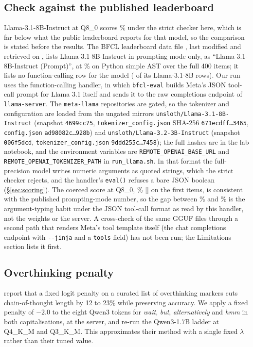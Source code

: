 \documentclass[12pt,letterpaper]{article}
\newcommand{\bfcl}{BFCL}
\newcommand{\qm}{Qwen3-1.7B}
\begin{document}
\subsection{Check against the published leaderboard}
\label{sec:sanity}
Llama-3.1-8B-Instruct at Q8\_0 scores \qtAccLlamaEightBEight{}\% under the strict checker here, which is far below what the public leaderboard reports for that model, so the comparison is stated before the results. The \bfcl{} leaderboard data file \citep{bfclleaderboard2026}, last modified \qtBfclDataDate{} and retrieved on \qtBfclFetchDate{}, lists Llama-3.1-8B-Instruct in prompting mode only, as ``Llama-3.1-8B-Instruct (Prompt)'', at \qtBfclPromptPySimple{}\% on Python simple AST over the full 400 items; it lists no function-calling row for the model (\qtBfclLlamaFcRows{} of its \qtBfclLlamaRows{} Llama-3.1-8B rows). Our run uses the function-calling handler, in which \texttt{bfcl-eval} builds Meta's JSON tool-call prompt for Llama 3.1 itself and sends it to the raw completions endpoint of \texttt{llama-server}. The \texttt{meta-llama} repositories are gated, so the tokenizer and configuration are loaded from the ungated mirrors \texttt{unsloth/Llama-3.1-8B-Instruct} (snapshot \texttt{4699cc75}, \texttt{tokenizer\_config.json} SHA-256 \texttt{671ecdff\ldots{}3465}, \texttt{config.json} \texttt{ad98082c\ldots{}928b}) and \texttt{unsloth/Llama-3.2-3B-Instruct} (snapshot \texttt{006f5dcd}, \texttt{tokenizer\_config.json} \texttt{9ddd255c\ldots{}7458}); the full hashes are in the lab notebook, and the environment variables are \texttt{REMOTE\_OPENAI\_BASE\_URL} and \texttt{REMOTE\_OPENAI\_TOKENIZER\_PATH} in \texttt{run\_llama.sh}. In that format the full-precision model writes numeric arguments as quoted strings, which the strict checker rejects, and the handler's \texttt{eval()} refuses a bare JSON boolean (\S\ref{sec:scoring}). The coerced score at Q8\_0, \qtCoercedAccLlamaEightBEight{}\% [\qtCoercedCiLlamaEightBEight{}] on the first \qtNEightB{} items, is consistent with the published prompting-mode number, so the gap between \qtAccLlamaEightBEight{}\% and \qtBfclPromptPySimple{}\% is the argument-typing habit under the JSON tool-call format as read by this handler, not the weights or the server. A cross-check of the same GGUF files through a second path that renders Meta's tool template itself (the chat completions endpoint with \texttt{-{}-jinja} and a \texttt{tools} field) has not been run; the Limitations section lists it first.

\subsection{Overthinking penalty}
\citet{lotfi2026overthink} report that a fixed logit penalty on a curated list of overthinking markers cuts chain-of-thought length by 12 to 23\% while preserving accuracy. We apply a fixed penalty of $-2.0$ to the eight Qwen3 tokens for \emph{wait}, \emph{but}, \emph{alternatively} and \emph{hmm} in both capitalisations, at the server, and re-run the \qm{} ladder at Q4\_K\_M and Q3\_K\_M. This approximates their method with a single fixed $\lambda$ rather than their tuned value.
\end{document}
